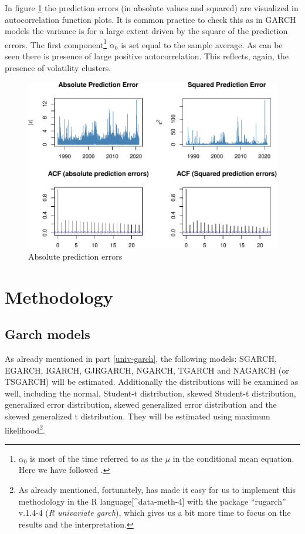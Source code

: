 \documentclass[a4paper, nobind]{templates/ociamthesis}
\begin{document}
\noindent In figure \ref{fig:acfplots} the prediction errors (in absolute values and squared) are visualized in autocorrelation function plots. It is common practice to check this as in GARCH models the variance is for a large extent driven by the square of the prediction errors. The first component\footnote{\(\alpha_0\) is most of the time referred to as the \(\mu\) in the conditional mean equation. Here we have followed \textcite{bali2008}.} \(\alpha_0\) is set equal to the sample average. As can be seen there is presence of large positive autocorrelation. This reflects, again, the presence of volatility clusters.

\begin{figure}[h]

{\centering \includegraphics[width=1\linewidth]{_main_files/figure-latex/acfplots-1} 

}

\caption{Absolute prediction errors}\label{fig:acfplots}
\end{figure}

\clearpage

\hypertarget{methodology}{%
\section{Methodology}\label{methodology}}

\hypertarget{garch-method}{%
\subsection{Garch models}\label{garch-method}}

\noindent As already mentioned in part \ref{univ-garch}, the following models: SGARCH, EGARCH, IGARCH, GJRGARCH, NGARCH, TGARCH and NAGARCH (or TSGARCH) will be estimated. Additionally the distributions will be examined as well, including the normal, Student-t distribution, skewed Student-t distribution, generalized error distribution, skewed generalized error distribution and the skewed generalized t distribution. They will be estimated using maximum likelihood\footnote{As already mentioned, fortunately, \textcite{alexios2020} has made it easy for us to implement this methodology in the R language{[}\^{}data-meth-4{]} \autocite{Rteam} with the package ``rugarch'' v.1.4-4 (\emph{R univariate garch}), which gives us a bit more time to focus on the results and the interpretation.}.~\\
\end{document}
